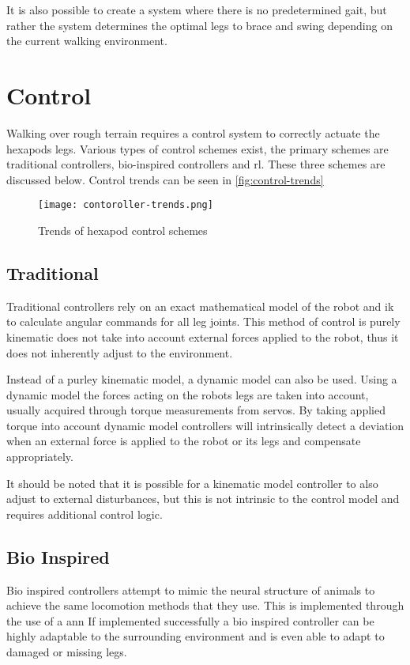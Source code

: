 It is also possible to create a system where there is no predetermined gait, but rather the system determines the optimal legs to brace and swing depending on the current walking environment.

\section{Control}
Walking over rough terrain requires a control system to correctly actuate the hexapods legs. Various types of control schemes exist, the primary schemes are traditional controllers,
bio-inspired controllers and \ac{rl}. These three schemes are discussed below. Control trends can be seen in \autoref{fig:control-trends}
\begin{figure}[h]
    \centering
    \texttt{[image: contoroller-trends.png]}
    \caption{Trends of hexapod control schemes \citep{coelho2021trends}}
    \label{fig:control-trends}
\end{figure}

    \subsection{Traditional}
    Traditional controllers rely on an exact mathematical model of the robot and \ac{ik} to calculate angular commands for all leg joints. This method of control is purely kinematic does not 
    take into account external forces applied to the robot, thus it does not inherently adjust to the environment.

    Instead of a purley kinematic model, a dynamic model can also be used. Using a dynamic model the forces acting on the robots legs are taken into account, usually acquired through torque measurements 
    from servos. By taking applied torque into account dynamic model controllers will intrinsically detect a deviation when an external force is applied to the robot or its legs and compensate appropriately.

    It should be noted that it is possible for a kinematic model controller to also adjust to external disturbances, but this is not intrinsic to the control model and requires additional control logic.
    
    \subsection{Bio Inspired}
    Bio inspired controllers attempt to mimic the neural structure of animals to achieve the same locomotion methods that they use. This is implemented through the use of a \ac{ann}
    If implemented successfully a bio inspired controller can be highly adaptable to the surrounding environment and is even able to adapt to damaged or missing legs.

